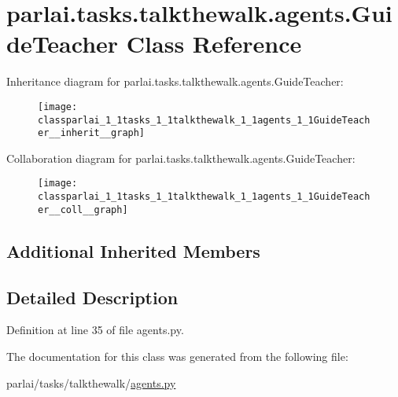 \hypertarget{classparlai_1_1tasks_1_1talkthewalk_1_1agents_1_1GuideTeacher}{}\section{parlai.\+tasks.\+talkthewalk.\+agents.\+Guide\+Teacher Class Reference}
\label{classparlai_1_1tasks_1_1talkthewalk_1_1agents_1_1GuideTeacher}


Inheritance diagram for parlai.\+tasks.\+talkthewalk.\+agents.\+Guide\+Teacher\+:
\nopagebreak
\begin{figure}[H]
\begin{center}
\leavevmode
\texttt{[image: classparlai\_1\_1tasks\_1\_1talkthewalk\_1\_1agents\_1\_1GuideTeacher\_\_inherit\_\_graph]}
\end{center}
\end{figure}


Collaboration diagram for parlai.\+tasks.\+talkthewalk.\+agents.\+Guide\+Teacher\+:
\nopagebreak
\begin{figure}[H]
\begin{center}
\leavevmode
\texttt{[image: classparlai\_1\_1tasks\_1\_1talkthewalk\_1\_1agents\_1\_1GuideTeacher\_\_coll\_\_graph]}
\end{center}
\end{figure}
\subsection*{Additional Inherited Members}


\subsection{Detailed Description}


Definition at line 35 of file agents.\+py.



The documentation for this class was generated from the following file\+:\begin{DoxyCompactItemize}
\item 
parlai/tasks/talkthewalk/\hyperlink{parlai_2tasks_2talkthewalk_2agents_8py}{agents.\+py}\end{DoxyCompactItemize}
